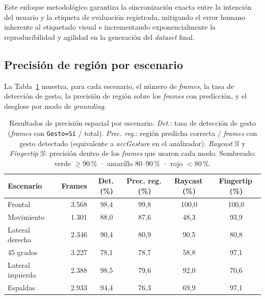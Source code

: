 \documentclass[12pt]{report} %
\begin{document}
Este enfoque metodológico garantiza la sincronización exacta entre la intención del usuario y la etiqueta de evaluación registrada, mitigando el error humano inherente al etiquetado visual e incrementando exponencialmente la reproducibilidad y agilidad en la generación del \textit{dataset} final.

\subsection{Precisión de región por escenario}

La Tabla~\ref{tab:fingerprint} muestra, para cada escenario, el número de \textit{frames}, la tasa de detección de gesto, la precisión de región sobre los \textit{frames} con predicción, y el desglose por modo de \textit{grounding}.

\begin{table}[H]
\caption{\label{tab:fingerprint}Resultados de precisión espacial por escenario. \textit{Det.}: tasa de detección de gesto (\textit{frames} con \texttt{Gesto=Sí} / total). \textit{Prec. reg.}: región predicha correcta / \textit{frames} con gesto detectado (equivalente a \textit{accGesture} en el analizador). \textit{Raycast\,\%} y \textit{Fingertip\,\%}: precisión dentro de los \textit{frames} que usaron cada modo. Sombreado: \colorbox{green!25}{verde} $\geq 90$\,\% · \colorbox{yellow!35}{amarillo} 80--90\,\% · \colorbox{red!20}{rojo} $< 80$\,\%.}
\begin{tabular}{lrcccc}
\hline
\textbf{Escenario} & \textbf{Frames} & \textbf{Det.\,(\%)} & \textbf{Prec. reg.\,(\%)} & \textbf{Raycast\,(\%)} & \textbf{Fingertip\,(\%)} \\
\hline
Frontal            & 3.568 & 98{,}4 & \cellcolor{green!25}99{,}8 & 100{,}0 & 100{,}0 \\
Movimiento         & 1.301 & 88{,}0 & \cellcolor{yellow!35}87{,}6 &  48{,}3 &  93{,}9 \\
Lateral derecha    & 2.346 & 90{,}4 & \cellcolor{yellow!35}80{,}9 &  90{,}5 &  80{,}8 \\
45 grados          & 3.227 & 78{,}1 & \cellcolor{red!20}78{,}7   &  58{,}8 &  97{,}1 \\
Lateral izquierda  & 2.388 & 98{,}5 & \cellcolor{red!20}79{,}6   &  92{,}0 &  70{,}6 \\
Espaldas           & 2.933 & 94{,}4 & \cellcolor{red!20}76{,}3   &  69{,}9 &  97{,}1 \\
\hline
\end{tabular}
\end{table}
\end{document}
